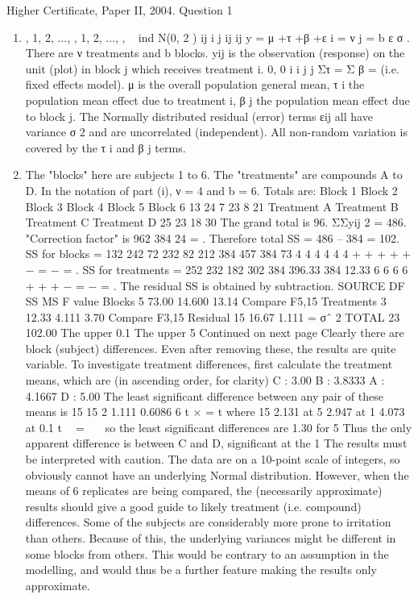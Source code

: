 \documentclass[a4paper,12pt]{article}
\begin{document}
Higher Certificate, Paper II, 2004. Question 1
\begin{enumerate}
\item , 1, 2, ..., , 1, 2, ..., , { } ~ ind N(0, 2 ) ij i j ij ij y = μ +τ +β +ε i = ν j = b ε σ .
There are ν treatments and b blocks. yij is the observation (response) on the unit (plot)
in block j which receives treatment i. 0, 0 i i j j Στ = Σ β = (i.e. fixed effects model).
μ is the overall population general mean, τ
i the population mean effect due to
treatment i, β
j the population mean effect due to block j. The Normally distributed
residual (error) terms εij all have variance σ 2 and are uncorrelated (independent). All
non-random variation is covered by the τ
i and β
j terms.
\item The "blocks" here are subjects 1 to 6. The "treatments" are compounds A to
D. In the notation of part (i), ν = 4 and b = 6.
Totals are: Block 1 Block 2 Block 3 Block 4 Block 5 Block 6
13 24 7 23 8 21
Treatment A Treatment B Treatment C Treatment D
25 23 18 30
The grand total is 96. ΣΣyij
2 = 486.
"Correction factor" is
962 384
24
= .
Therefore total SS = 486 – 384 = 102.
SS for blocks =
132 242 72 232 82 212 384 457 384 73
4 4 4 4 4 4
+ + + + + − = − = .
SS for treatments =
252 232 182 302 384 396.33 384 12.33
6 6 6 6
+ + + − = − = .
The residual SS is obtained by subtraction.
SOURCE DF SS MS F value
Blocks 5 73.00 14.600 13.14 Compare F5,15
Treatments 3 12.33 4.111 3.70 Compare F3,15
Residual 15 16.67 1.111 = σˆ 2
TOTAL 23 102.00
The upper 0.1%
The upper 5%
Continued on next page
Clearly there are block (subject) differences. Even after removing these, the results
are quite variable.
To investigate treatment differences, first calculate the treatment means, which are (in
ascending order, for clarity)
C : 3.00 B : 3.8333 A : 4.1667 D : 5.00
The least significant difference between any pair of these means is
15 15
2 1.111 0.6086
6
t × = t where 15
2.131 at 5%
2.947 at 1%
4.073 at 0.1%
t

=


so the least significant differences are 1.30 for 5%
Thus the only apparent difference is between C and D, significant at the 1%
The results must be interpreted with caution.
The data are on a 10-point scale of integers, so obviously cannot have an underlying
Normal distribution. However, when the means of 6 replicates are being compared,
the (necessarily approximate) results should give a good guide to likely treatment (i.e.
compound) differences.
Some of the subjects are considerably more prone to irritation than others. Because of
this, the underlying variances might be different in some blocks from others. This
would be contrary to an assumption in the modelling, and would thus be a further
feature making the results only approximate.\end{enumerate}
\end{document}

